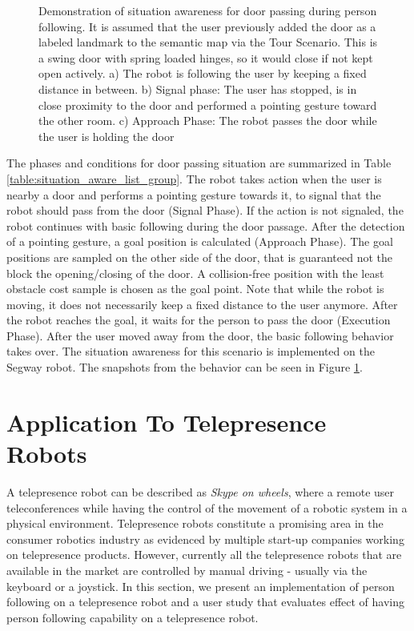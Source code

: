 \begin{figure}[ht!]
{        }
    \caption{Demonstration of situation awareness for door passing during person following. It is assumed that the user previously added the door as a labeled landmark to the semantic map via the Tour Scenario. This is a swing door with spring loaded hinges, so it would close if not kept open actively. a) The robot is following the user by keeping a fixed distance in between. b) Signal phase: The user has stopped, is in close proximity to the door and performed a pointing gesture toward the other room. c) Approach Phase: The robot passes the door while the user is holding the door}
   \label{fig:situtation_aware_door_passing}
\end{figure}



The phases and conditions for door passing situation are summarized in Table \ref{table:situation_aware_list_group}. The robot takes action when the user is nearby a door and performs a pointing gesture towards it, to signal that the robot should pass from the door (Signal Phase). If the action is not signaled, the robot continues with basic following during the door passage. After the detection of a pointing gesture, a goal position is calculated (Approach Phase). The goal positions are sampled on the other side of the door, that is guaranteed not the block the opening/closing of the door. A collision-free position with the least obstacle cost sample is chosen as the goal point. Note that while the robot is moving, it does not necessarily keep a fixed distance to the user anymore. After the robot reaches the goal, it waits for the person to pass the door (Execution Phase). After the user moved away from the door, the basic following behavior takes over. The situation awareness for this scenario is implemented on the Segway robot. The snapshots from the behavior can be seen in Figure \ref{fig:situtation_aware_door_passing}.

\section{Application To Telepresence Robots}
\label{sec:following_application_to_telepresence}

A telepresence robot can be described as \textit{Skype on wheels}, where a remote user teleconferences while having the control of the movement of a robotic system in a physical environment. Telepresence robots constitute a promising area in the consumer robotics industry as evidenced by multiple start-up companies working on telepresence products. However, currently all the telepresence robots that are available in the market are controlled by manual driving - usually via the keyboard or a joystick. In this section, we present an implementation of person following on a telepresence robot and a user study that evaluates effect of having person following capability on a telepresence robot.

